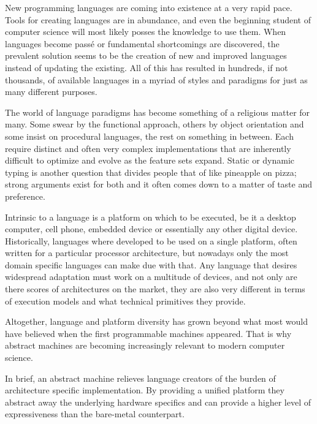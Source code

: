 

New programming languages are coming into existence at a very rapid pace. Tools
for creating languages are in abundance, and even the beginning student of
computer science will most likely posses the knowledge to use them. When
languages become pass\'e or fundamental shortcomings are discovered, the
prevalent solution seems to be the creation of new and improved languages
instead of updating the existing. All of this has resulted in hundreds, if not
thousands, of available languages in a myriad of styles and paradigms for just
as many different purposes.

The world of language paradigms has become something of a religious matter for
many. Some swear by the functional approach, others by object orientation and
some insist on procedural languages, the rest on something in between. Each
require distinct and often very complex implementations that are inherently
difficult to optimize and evolve as the feature sets expand. Static or dynamic
typing is another question that divides people that of like pineapple on
pizza; strong arguments exist for both and it often comes down to a matter of
taste and preference.

Intrinsic to a language is a platform on which to be executed, be it a desktop
computer, cell phone, embedded device or essentially any other digital
device. Historically, languages where developed to be used on a single platform,
often written for a particular processor architecture, but nowadays only the
most domain specific languages can make due with that. Any language that desires
widespread adaptation must work on a multitude of devices, and not only are
there scores of architectures on the market, they are also very different in
terms of execution models and what technical primitives they provide.

Altogether, language and platform diversity has grown beyond what most would have
believed when the first programmable machines appeared. That is why abstract
machines are becoming increasingly relevant to modern computer science.

In brief, an abstract machine relieves language creators of the burden of
architecture specific implementation. By providing a unified platform they
abstract away the underlying hardware specifics and can provide a higher level
of expressiveness than the bare-metal counterpart.

